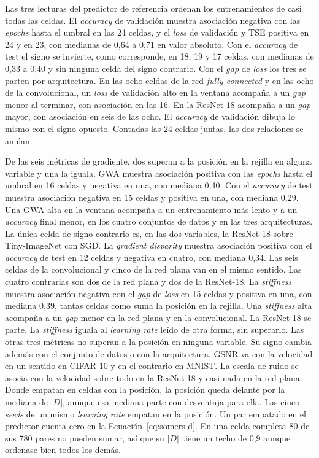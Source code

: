 Las tres lecturas del predictor de referencia ordenan los entrenamientos de casi todas las celdas. El \emph{accuracy} de validación muestra asociación negativa con las \emph{epochs} hasta el umbral en las 24 celdas, y el \emph{loss} de validación y TSE positiva en 24 y en 23, con medianas de 0,64 a 0,71 en valor absoluto. Con el \emph{accuracy} de test el signo se invierte, como corresponde, en 18, 19 y 17 celdas, con medianas de 0,33 a 0,40 y sin ninguna celda del signo contrario. Con el \emph{gap} de \emph{loss} los tres se parten por arquitectura. En las ocho celdas de la red \emph{fully connected} y en las ocho de la convolucional, un \emph{loss} de validación alto en la ventana acompaña a un \emph{gap} menor al terminar, con asociación en las 16. En la ResNet-18 acompaña a un \emph{gap} mayor, con asociación en seis de las ocho. El \emph{accuracy} de validación dibuja lo mismo con el signo opuesto. Contadas las 24 celdas juntas, las dos relaciones se anulan.

De las seis métricas de gradiente, dos superan a la posición en la rejilla en alguna variable y una la iguala. GWA muestra asociación positiva con las \emph{epochs} hasta el umbral en 16 celdas y negativa en una, con mediana 0,40. Con el \emph{accuracy} de test muestra asociación negativa en 15 celdas y positiva en una, con mediana 0,29. Una GWA alta en la ventana acompaña a un entrenamiento más lento y a un \emph{accuracy} final menor, en los cuatro conjuntos de datos y en las tres arquitecturas. La única celda de signo contrario es, en las dos variables, la ResNet-18 sobre Tiny-ImageNet con SGD. La \emph{gradient disparity} muestra asociación positiva con el \emph{accuracy} de test en 12 celdas y negativa en cuatro, con mediana 0,34. Las seis celdas de la convolucional y cinco de la red plana van en el mismo sentido. Las cuatro contrarias son dos de la red plana y dos de la ResNet-18. La \emph{stiffness} muestra asociación negativa con el \emph{gap} de \emph{loss} en 15 celdas y positiva en una, con mediana 0,39, tantas celdas como suma la posición en la rejilla. Una \emph{stiffness} alta acompaña a un \emph{gap} menor en la red plana y en la convolucional. La ResNet-18 se parte. La \emph{stiffness} iguala al \emph{learning rate} leído de otra forma, sin superarlo. Las otras tres métricas no superan a la posición en ninguna variable. Su signo cambia además con el conjunto de datos o con la arquitectura. GSNR va con la velocidad en un sentido en CIFAR-10 y en el contrario en MNIST. La escala de ruido se asocia con la velocidad sobre todo en la ResNet-18 y casi nada en la red plana. Donde empatan en celdas con la posición, la posición queda delante por la mediana de $|D|$, aunque esa mediana parte con desventaja para ella. Las cinco \emph{seeds} de un mismo \emph{learning rate} empatan en la posición. Un par empatado en el predictor cuenta cero en la Ecuación~\ref{eq:somers-d}. En una celda completa 80 de sus 780 pares no pueden sumar, así que su $|D|$ tiene un techo de 0,9 aunque ordenase bien todos los demás.

